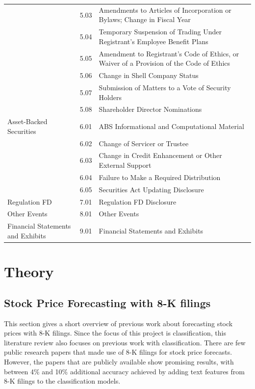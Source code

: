 \documentclass{article}
\begin{document}
\begin{table}[h!]
\begin{tabularx}{\textwidth}{|X|l|X|}
		& 5.03 & Amendments to Articles of Incorporation or Bylaws; Change in Fiscal Year \\
		& 5.04 & Temporary Suspension of Trading Under Registrant's Employee Benefit Plans \\
		& 5.05 & Amendment to Registrant's Code of Ethics, or Waiver of a Provision of the Code of Ethics \\
		& 5.06 & Change in Shell Company Status \\
		& 5.07 & Submission of Matters to a Vote of Security Holders \\
		& 5.08 & Shareholder Director Nominations \\
		Asset-Backed Securities & 6.01 & ABS Informational and Computational Material \\
		& 6.02 & Change of Servicer or Trustee \\
		& 6.03 & Change in Credit Enhancement or Other External Support \\
		& 6.04 & Failure to Make a Required Distribution \\
		& 6.05 & Securities Act Updating Disclosure \\
		Regulation FD & 7.01 & Regulation FD Disclosure \\
		Other Events & 8.01 & Other Events \\
		Financial Statements and Exhibits & 9.01 & Financial Statements and Exhibits \\
		\bottomrule
	\end{tabularx}

	\end{table}%



	\section{Theory}
	
	\subsection{Stock Price Forecasting with 8-K filings}
	
	This section gives a short overview of previous work about forecasting stock prices with 8-K filings. Since the focus of this project is classification, this literature review also focuses on previous work with classification. There are few public research papers that made use of 8-K filings for stock price forecasts. However, the papers that are publicly available show promising results, with between 4\% and 10\% additional accuracy achieved by adding text features from 8-K filings to the classification models.
	
\end{document}
